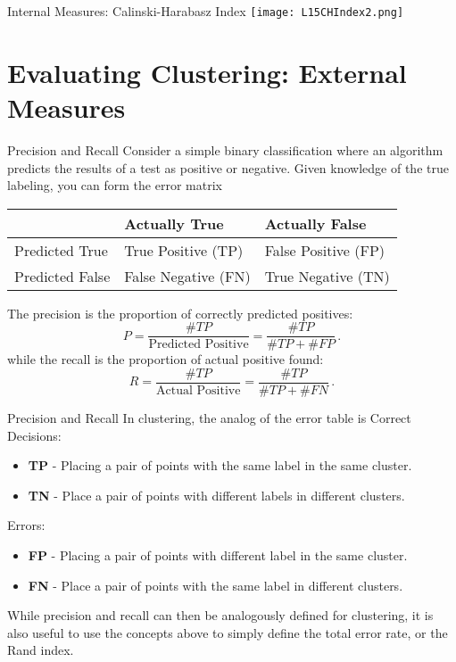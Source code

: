 \documentclass[10pt, table, dvipsnames,xcdraw,handout]{beamer}
\begin{document}
\begin{frame}[fragile]{Internal Measures: Calinski-Harabasz Index}
	\centering \texttt{[image: L15CHIndex2.png]} 
\end{frame}

\section{Evaluating Clustering: External Measures}



\begin{frame}[fragile]{Precision and Recall}
Consider a simple binary classification where an algorithm predicts the results of a test as positive or negative. Given knowledge of the true labeling, you can form the error matrix

\begin{table}[]
\begin{tabular}{l | ll}
  & Actually True & Actually False \\  \hline
Predicted True & True Positive (TP)  & False Positive (FP) \\
Predicted False & False Negative (FN)  &  True Negative (TN) 
\end{tabular}
\end{table}
The precision is the proportion of correctly predicted positives:
$$
P = \frac{\# TP}{\text{Predicted Positive}} = \frac{\# TP}{\# TP + \# FP}\,.
$$
while the recall is the proportion of actual positive found:
$$
R = \frac{\# TP}{\text{Actual Positive}} = \frac{\# TP}{\# TP + \# FN}\,.
$$
\end{frame}


\begin{frame}[fragile]{Precision and Recall}
In clustering, the analog of the error table is 
Correct Decisions:
\begin{itemize}
\item \textbf{TP} - Placing a pair of points with the same label in the same cluster.
\item \textbf{TN} - Place a pair of points with different labels in different clusters. 
\end{itemize}
Errors:
\begin{itemize}
\item \textbf{FP} - Placing a pair of points with different label in the same cluster.
\item \textbf{FN} - Place a pair of points with the same label in different clusters. 
\end{itemize}

While precision and recall can then be analogously defined for clustering, it is also useful to use the concepts above to simply define the total error rate, or the Rand index. 
\end{frame}
\end{document}
